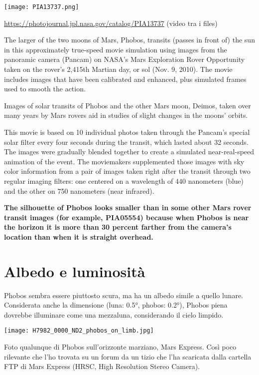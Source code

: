 \documentclass[a4paper,10pt,openany,oneside]{memoir}
\begin{document}
\texttt{[image: PIA13737.png]}

\url{https://photojournal.jpl.nasa.gov/catalog/PIA13737} (video tra i files)

The larger of the two moons of Mars, Phobos, transits (passes in front of) the sun in this approximately true-speed movie simulation using images from the panoramic camera (Pancam) on NASA's Mars Exploration Rover Opportunity taken on the rover's 2,415th Martian day, or sol (Nov. 9, 2010). The movie includes images that have been calibrated and enhanced, plus simulated frames used to smooth the action.

Images of solar transits of Phobos and the other Mars moon, Deimos, taken over many years by Mars rovers aid in studies of slight changes in the moons' orbits.

This movie is based on 10 individual photos taken through the Pancam's special solar filter every four seconds during the transit, which lasted about 32 seconds. The images were gradually blended together to create a simulated near-real-speed animation of the event. The moviemakers supplemented those images with sky color information from a pair of images taken right after the transit through two regular imaging filters: one centered on a wavelength of 440 nanometers (blue) and the other on 750 nanometers (near infrared).

\textbf{The silhouette of Phobos looks smaller than in some other Mars rover transit images (for example, PIA05554) because when Phobos is near the horizon it is more than 30 percent farther from the camera's location than when it is straight overhead.}

\section{Albedo e luminosità}

Phobos sembra essere piuttosto scura, ma ha un albedo simile a quello lunare. Considerata anche la dimensione (luna: 0.5°, phobos: 0.2°), Phobos piena dovrebbe illuminare come una mezzaluna, considerando il cielo limpido. 

\hfill

\texttt{[image: H7982\_0000\_ND2\_phobos\_on\_limb.jpg]}

Foto qualunque di Phobos sull'orizzonte marziano, Mars Express. Così poco rilevante che l'ho trovata su un forum da un tizio che l'ha scaricata dalla cartella FTP di Mars Express (HRSC, High Resolution Stereo Camera). 
\end{document}
